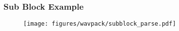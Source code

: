 \subsubsection{Sub Block Example}
\begin{figure}[h]
\texttt{[image: figures/wavpack/subblock\_parse.pdf]}
\end{figure}






